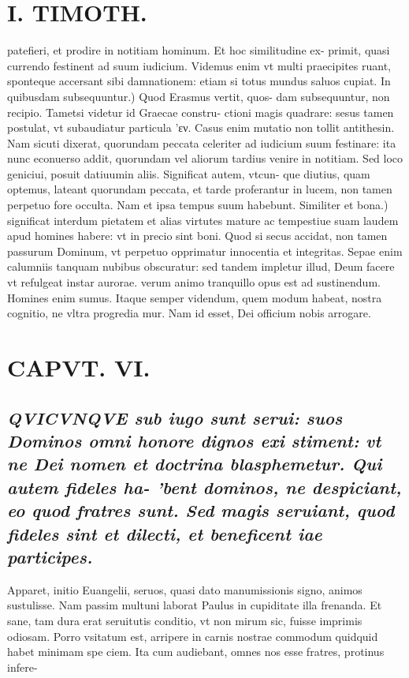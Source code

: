 \documentclass{article}
\begin{document}
\begin{pages}
\section*{I. TIMOTH. }
\marginpar{[ p.72 ]}\pstart patefieri, et prodire in notitiam hominum. Et hoc similitudine ex- primit, quasi currendo festinent ad suum iudicium. Videmus enim vt multi praecipites ruant, sponteque accersant sibi damnationem: etiam si totus mundus saluos cupiat.  \pend\pstart In quibusdam subsequuntur.) Quod Erasmus vertit, quos- dam subsequuntur, non recipio. Tametsi videtur id Graecae constru- ctioni magis quadrare: sesus tamen postulat, vt subaudiatur particula ’εν. Casus enim mutatio non tollit antithesin. Nam sicuti dixerat, quorundam peccata celeriter ad iudicium suum festinare: ita nunc econuerso addit, quorundam vel aliorum tardius venire in notitiam. Sed loco geniciui, posuit datiuumin aliis. Significat autem, vtcun- que diutius, quam optemus, lateant quorundam peccata, et tarde proferantur in lucem, non tamen perpetuo fore occulta. Nam et ipsa tempus suum habebunt.  \pend\pstart Similiter et bona.) significat interdum pietatem et alias virtutes mature ac tempestiue suam laudem apud homines habere: vt in precio sint boni. Quod si secus accidat, non tamen passurum Dominum, vt perpetuo opprimatur innocentia et integritas. Sepae enim calumniis tanquam nubibus obscuratur: sed tandem impletur illud, Deum facere vt refulgeat instar aurorae. verum animo tranquillo opus est ad sustinendum. Homines enim sumus. Itaque semper videndum, quem modum habeat, nostra cognitio, ne vltra progredia mur. Nam id esset, Dei officium nobis arrogare.  \pend
\endnumbering\beginnumbering\section{CAPVT. VI.}
{}
\subsection*{\textit{\huge\textbf{Q}\normalsize VICVNQVE sub iugo sunt serui: suos Dominos omni honore dignos exi stiment: vt ne Dei nomen et doctrina blasphemetur. Qui autem fideles ha- 'bent dominos, ne despiciant, eo quod fratres sunt. Sed magis seruiant, quod fideles sint et dilecti, et beneficent iae participes. }}\pstart Apparet, initio Euangelii, seruos, quasi dato manumissionis signo, animos sustulisse. Nam passim multuni laborat Paulus in cupiditate illa frenanda. Et sane, tam dura erat seruitutis conditio, vt non mirum sic, fuisse imprimis odiosam. Porro vsitatum est, arripere in carnis nostrae commodum quidquid habet minimam spe ciem. Ita cum audiebant, omnes nos esse fratres, protinus infere-  \pend

\end{pages}
\end{document}
